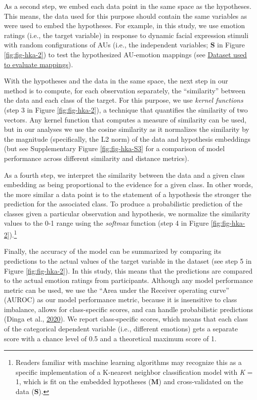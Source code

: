 \documentclass[11pt,american,a4paper,oneside,]{memoir} %
\let\rmarkdownfootnote\footnote%
\def\footnote{\protect\rmarkdownfootnote}
\begin{document}
As a second step, we embed each data point in the same space as the hypotheses. This means, the data used for this purpose should contain the same variables as were used to embed the hypotheses. For example, in this study, we use emotion ratings (i.e., the target variable) in response to dynamic facial expression stimuli with random configurations of AUs (i.e., the independent variables; \(\mathbf{S}\) in Figure \ref{fig:fig-hka-2}) to test the hypothesized AU-emotion mappings (see \protect\hyperlink{hka-dataset}{Dataset used to evaluate mappings}).

With the hypotheses and the data in the same space, the next step in our method is to compute, for each observation separately, the ``similarity'' between the data and each class of the target. For this purpose, we use \emph{kernel functions} (step 3 in Figure \ref{fig:fig-hka-2}), a technique that quantifies the similarity of two vectors. Any kernel function that computes a measure of similarity can be used, but in our analyses we use the cosine similarity as it normalizes the similarity by the magnitude (specifically, the L2 norm) of the data and hypothesis embeddings (but see Supplementary Figure \ref{fig:fig-hka-S3} for a comparison of model performance across different similarity and distance metrics).

As a fourth step, we interpret the similarity between the data and a given class embedding as being proportional to the evidence for a given class. In other words, the more similar a data point is to the statement of a hypothesis the stronger the prediction for the associated class. To produce a probabilistic prediction of the classes given a particular observation and hypothesis, we normalize the similarity values to the 0-1 range using the \emph{softmax} function (step 4 in Figure \ref{fig:fig-hka-2}).\footnote{Readers familiar with machine learning algorithms may recognize this as a specific implementation of a K-nearest neighbor classification model with \emph{K} = 1, which is fit on the embedded hypotheses (\(\mathbf{M}\)) and cross-validated on the data (\(\mathbf{S}\)).}

Finally, the accuracy of the model can be summarized by comparing its predictions to the actual values of the target variable in the dataset (see step 5 in Figure \ref{fig:fig-hka-2}). In this study, this means that the predictions are compared to the actual emotion ratings from participants. Although any model performance metric can be used, we use the ``Area under the Receiver operating curve'' (AUROC) as our model performance metric, because it is insensitive to class imbalance, allows for class-specific scores, and can handle probabilistic predictions (Dinga et al., \protect\hyperlink{ref-Dinga2020-si}{2020}). We report class-specific scores, which means that each class of the categorical dependent variable (i.e., different emotions) gets a separate score with a chance level of 0.5 and a theoretical maximum score of 1.
\end{document}
